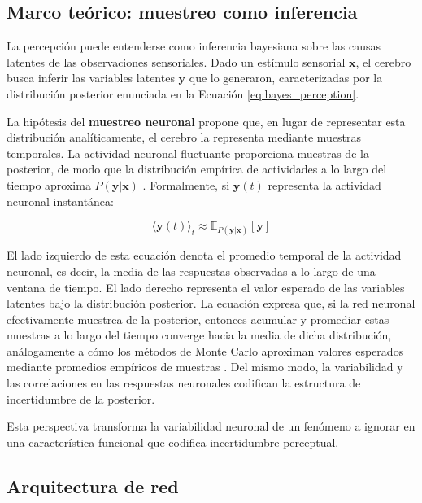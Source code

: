 \subsection{Marco teórico: muestreo como inferencia}
\label{subsec:echeveste_marco}

La percepción puede entenderse como inferencia bayesiana sobre las causas latentes de las observaciones sensoriales. Dado un estímulo sensorial $\mathbf{x}$, el cerebro busca inferir las variables latentes $\mathbf{y}$ que lo generaron, caracterizadas por la distribución posterior enunciada en la Ecuación \ref{eq:bayes_perception}.

La hipótesis del \textbf{muestreo neuronal} propone que, en lugar de representar esta distribución analíticamente, el cerebro la representa mediante muestras temporales. La actividad neuronal fluctuante proporciona muestras de la posterior, de modo que la distribución empírica de actividades a lo largo del tiempo aproxima $P(\mathbf{y}|\mathbf{x})$ \citep{echeveste2020cortical}. Formalmente, si $\mathbf{y}(t)$ representa la actividad neuronal instantánea:


\begin{equation}
\langle \mathbf{y}(t) \rangle_t \approx \mathbb{E}_{P(\mathbf{y}|\mathbf{x})}[\mathbf{y}]
\label{eq:neural_sampling_mean}
\end{equation}

El lado izquierdo de esta ecuación denota el promedio temporal de la actividad neuronal, es decir, la media de las respuestas observadas a lo largo de una ventana de tiempo. El lado derecho representa el valor esperado de las variables latentes bajo la distribución posterior. La ecuación expresa que, si la red neuronal efectivamente muestrea de la posterior, entonces acumular y promediar estas muestras a lo largo del tiempo converge hacia la media de dicha distribución, análogamente a cómo los métodos de Monte Carlo aproximan valores esperados mediante promedios empíricos de muestras \citep{gerstner2002spiking}. Del mismo modo, la variabilidad y las correlaciones en las respuestas neuronales codifican la estructura de incertidumbre de la posterior.


Esta perspectiva transforma la variabilidad neuronal de un fenómeno a ignorar en una característica funcional que codifica incertidumbre perceptual.

\subsection{Arquitectura de red}
\label{subsec:echeveste_arquitectura}

